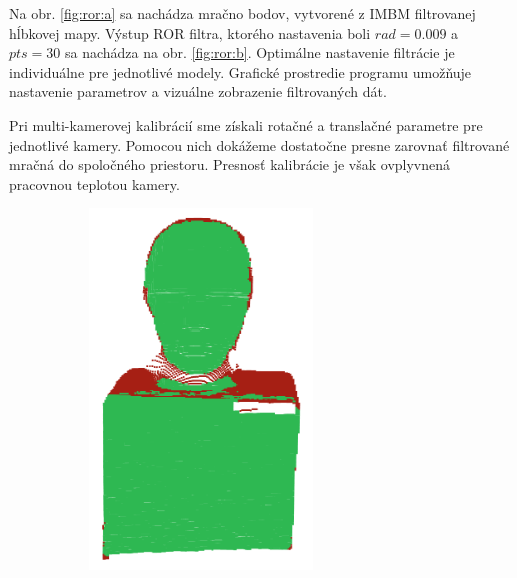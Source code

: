 Na obr. \ref{fig:ror:a} sa nachádza mračno bodov, vytvorené z IMBM filtrovanej hĺbkovej mapy. Výstup ROR filtra, ktorého nastavenia boli $rad=0.009$ a $pts=30$ sa nachádza na obr. \ref{fig:ror:b}. Optimálne nastavenie filtrácie je individuálne pre jednotlivé modely. Grafické prostredie programu umožňuje nastavenie parametrov a vizuálne zobrazenie filtrovaných dát.

Pri multi-kamerovej kalibrácií sme získali rotačné a translačné parametre pre jednotlivé kamery. Pomocou nich dokážeme dostatočne presne zarovnať filtrované mračná do spoločného priestoru. Presnosť kalibrácie je však ovplyvnená pracovnou teplotou kamery. 

\begin{figure}[h]
	\centering
	\begin{subfigure}[b]{0.32\textwidth}
		\centering
		\includegraphics[width=0.65\textwidth]{figures/icp1.png}
		\caption{}
		\label{fig:icp:a}
	\end{subfigure}
	\hfill
	\begin{subfigure}[b]{0.32\textwidth}
		\centering

\end{subfigure}
\end{figure}
